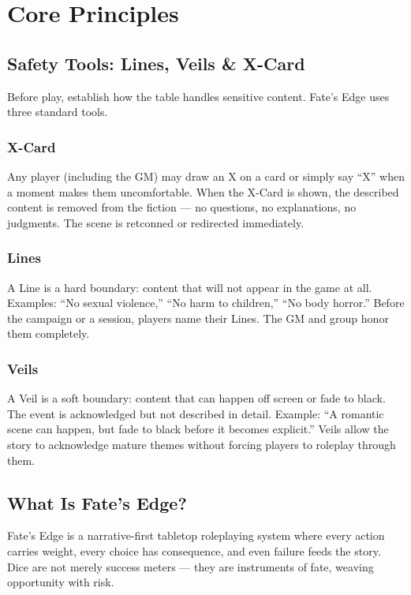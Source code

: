 
\section{Core Principles}

\subsection{Safety Tools: Lines, Veils \& X-Card}

Before play, establish how the table handles sensitive content. Fate's Edge uses three standard tools.

\subsubsection*{X-Card}
Any player (including the GM) may draw an X on a card or simply say ``X'' when a moment makes them uncomfortable. When the X-Card is shown, the described content is removed from the fiction — no questions, no explanations, no judgments. The scene is retconned or redirected immediately.

\subsubsection*{Lines}
A Line is a hard boundary: content that will not appear in the game at all. Examples: ``No sexual violence,'' ``No harm to children,'' ``No body horror.'' Before the campaign or a session, players name their Lines. The GM and group honor them completely.

\subsubsection*{Veils}
A Veil is a soft boundary: content that can happen off screen or fade to black. The event is acknowledged but not described in detail. Example: ``A romantic scene can happen, but fade to black before it becomes explicit.'' Veils allow the story to acknowledge mature themes without forcing players to roleplay through them.

\subsection{What Is Fate's Edge?}

Fate's Edge is a narrative-first tabletop roleplaying system where every action carries weight, every choice has consequence, and even failure feeds the story. Dice are not merely success meters — they are instruments of fate, weaving opportunity with risk.

